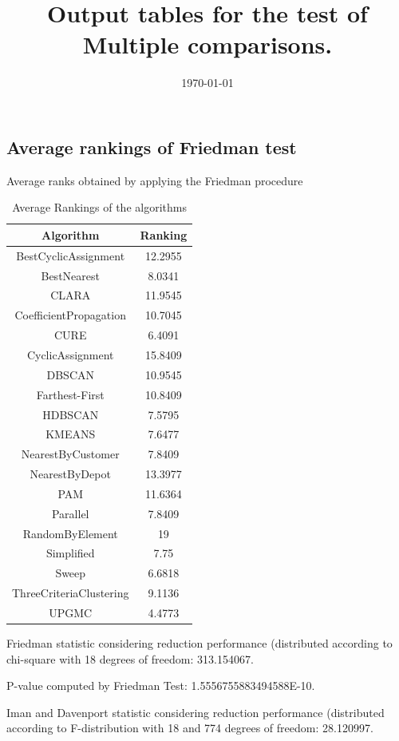\documentclass[a4paper,10pt]{article}
\title{Output tables for the test of Multiple comparisons.}
\author{}
\date{\today}
\begin{document}
\begin{landscape}
\pagestyle{empty}
\maketitle
\thispagestyle{empty}
\section{Average rankings of Friedman test}



Average ranks obtained by applying the Friedman procedure

\begin{table}[!htp]
\centering
\begin{tabular}{|c|c|}\hline
Algorithm&Ranking\\\hline
BestCyclicAssignment & 12.2955\\
BestNearest & 8.0341\\
CLARA & 11.9545\\
CoefficientPropagation & 10.7045\\
CURE & 6.4091\\
CyclicAssignment & 15.8409\\
DBSCAN & 10.9545\\
Farthest-First & 10.8409\\
HDBSCAN & 7.5795\\
KMEANS & 7.6477\\
NearestByCustomer & 7.8409\\
NearestByDepot & 13.3977\\
PAM & 11.6364\\
Parallel & 7.8409\\
RandomByElement & 19\\
Simplified & 7.75\\
Sweep & 6.6818\\
ThreeCriteriaClustering & 9.1136\\
UPGMC & 4.4773\\
\hline
\end{tabular}
\caption{Average Rankings of the algorithms}
\end{table}

Friedman statistic considering reduction performance (distributed according to chi-square with 18 degrees of freedom: 313.154067.

P-value computed by Friedman Test: 1.5556755883494588E-10.\newline

Iman and Davenport statistic considering reduction performance (distributed according to F-distribution with 18 and 774 degrees of freedom: 28.120997.


\end{landscape}
\end{document}
